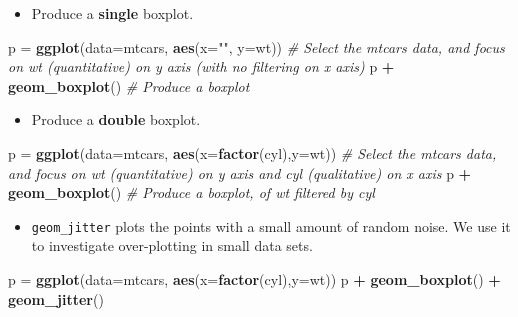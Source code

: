 \documentclass[]{article}
\newenvironment{Shaded}{\begin{snugshade}}{\end{snugshade}}
\newcommand{\CommentTok}[1]{\textcolor[rgb]{0.56,0.35,0.01}{\textit{#1}}}
\newcommand{\DataTypeTok}[1]{\textcolor[rgb]{0.13,0.29,0.53}{#1}}
\newcommand{\KeywordTok}[1]{\textcolor[rgb]{0.13,0.29,0.53}{\textbf{#1}}}
\newcommand{\NormalTok}[1]{#1}
\newcommand{\OperatorTok}[1]{\textcolor[rgb]{0.81,0.36,0.00}{\textbf{#1}}}
\newcommand{\StringTok}[1]{\textcolor[rgb]{0.31,0.60,0.02}{#1}}
\providecommand{\tightlist}{%
  \setlength{\itemsep}{0pt}\setlength{\parskip}{0pt}}
\begin{document}
\begin{itemize}
\tightlist
\item
  Produce a \textbf{single} boxplot.
\end{itemize}

\begin{Shaded}
\begin{Highlighting}[]
\NormalTok{p =}\StringTok{ }\KeywordTok{ggplot}\NormalTok{(}\DataTypeTok{data=}\NormalTok{mtcars, }\KeywordTok{aes}\NormalTok{(}\DataTypeTok{x=}\StringTok{""}\NormalTok{, }\DataTypeTok{y=}\NormalTok{wt))  }\CommentTok{# Select the mtcars data, and focus on wt (quantitative) on y axis (with no filtering on x axis)}
\NormalTok{p }\OperatorTok{+}\StringTok{ }\KeywordTok{geom_boxplot}\NormalTok{() }\CommentTok{# Produce a boxplot}
\end{Highlighting}
\end{Shaded}

\begin{itemize}
\tightlist
\item
  Produce a \textbf{double} boxplot.
\end{itemize}

\begin{Shaded}
\begin{Highlighting}[]
\NormalTok{p =}\StringTok{ }\KeywordTok{ggplot}\NormalTok{(}\DataTypeTok{data=}\NormalTok{mtcars, }\KeywordTok{aes}\NormalTok{(}\DataTypeTok{x=}\KeywordTok{factor}\NormalTok{(cyl),}\DataTypeTok{y=}\NormalTok{wt))  }\CommentTok{# Select the mtcars data, and focus on wt (quantitative) on y axis and cyl (qualitative) on x axis}
\NormalTok{p }\OperatorTok{+}\StringTok{ }\KeywordTok{geom_boxplot}\NormalTok{() }\CommentTok{# Produce a boxplot, of wt filtered by cyl}
\end{Highlighting}
\end{Shaded}

\begin{itemize}
\tightlist
\item
  \texttt{geom\_jitter} plots the points with a small amount of random noise. We use it to investigate over-plotting in small data sets.
\end{itemize}

\begin{Shaded}
\begin{Highlighting}[]
\NormalTok{p =}\StringTok{ }\KeywordTok{ggplot}\NormalTok{(}\DataTypeTok{data=}\NormalTok{mtcars, }\KeywordTok{aes}\NormalTok{(}\DataTypeTok{x=}\KeywordTok{factor}\NormalTok{(cyl),}\DataTypeTok{y=}\NormalTok{wt))}
\NormalTok{p }\OperatorTok{+}\StringTok{ }\KeywordTok{geom_boxplot}\NormalTok{() }\OperatorTok{+}\StringTok{ }\KeywordTok{geom_jitter}\NormalTok{()}
\end{Highlighting}
\end{Shaded}
\end{document}
